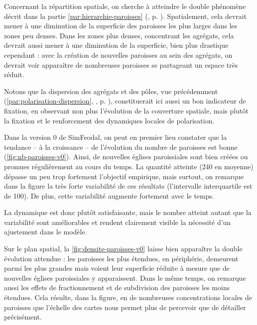 Concernant la répartition spatiale, on cherche à atteindre le double phénomène décrit dans la partie \ref{par:hierarchie-paroisses} (, p. \pageref{par:hierarchie-paroisses}).
Spatialement, cela devrait mener à une diminution de la superficie des paroisses les plus larges dans les zones peu denses.
Dans les zones plus denses, concentrant les agrégats, cela devrait aussi mener à une diminution de la superficie, bien plus drastique cependant : avec la création de nouvelles paroisses au sein des agrégats, on devrait voir apparaître de nombreuses paroisses se partageant un espace très réduit.

Notons que la dispersion des agrégats et des pôles, vue précédemment (\ref{par:polarisation-dispersion}, , p. \pageref{par:polarisation-dispersion}), constituerait ici aussi un bon indicateur de fixation, en observant non plus l'évolution de la couverture spatiale, mais plutôt la fixation et le renforcement des dynamiques locales de polarisation.

\begin{mdframed}[backgroundcolor=gray!10,footnoteinside=false]
Dans la version 0 de SimFeodal, on peut en premier lieu constater que la tendance -- à la croissance -- de l'évolution du nombre de paroisses est bonne (\cref{fig:nb-paroisses-v0}).
Ainsi, de nouvelles églises paroissiales sont bien créées ou promues régulièrement au cours du temps.
La quantité atteinte ($240$ en moyenne) dépasse un peu trop fortement l'objectif empirique, mais surtout, on remarque dans la figure la très forte variabilité de ces résultats (l'intervalle interquartile est de 100). De plus, cette variabilité augmente fortement avec le temps.

La dynamique est donc plutôt satisfaisante, mais le nombre atteint autant que la variabilité sont améliorables et rendent clairement visible la nécessité d'un ajustement dans le modèle.

Sur le plan spatial, la \cref{fig:densite-paroisses-v0} laisse bien apparaître la double évolution attendue : les paroisses les plus étendues, en périphérie, demeurent parmi les plus grandes mais voient leur superficie réduite à mesure que de nouvelles églises paroissiales y apparaissent.
Dans le même temps, on remarque aussi les effets de fractionnement et de subdivision des paroisses les moins étendues.
Cela résulte, dans la figure, en de nombreuses concentrations locales de paroisses que l'échelle des cartes nous permet plus de percevoir que de détailler précisément\footnotemark{}.
\end{mdframed}

